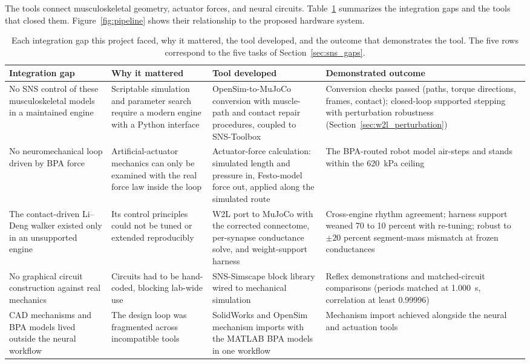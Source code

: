 The tools connect musculoskeletal geometry, actuator forces, and neural circuits. Table~\ref{tab:sns_capability} summarizes the integration gaps and the tools that closed them. Figure~\ref{fig:pipeline} shows their relationship to the proposed hardware system.

\begin{table}[htbp]
\caption[Integration gaps and the tools that closed them]{Each integration gap this project faced, why it mattered, the tool developed, and the outcome that demonstrates the tool. The five rows correspond to the five tasks of Section~\ref{sec:sns_gaps}.}
\label{tab:sns_capability}
\small
\begin{tabularx}{\textwidth}{@{}>{\raggedright\arraybackslash}p{}>{\raggedright\arraybackslash}p{}>{\raggedright\arraybackslash}p{}>{\raggedright\arraybackslash}X@{}}
\toprule
\textbf{Integration gap} & \textbf{Why it mattered} & \textbf{Tool developed} & \textbf{Demonstrated outcome} \\
\midrule
No SNS control of these musculoskeletal models in a maintained engine & Scriptable simulation and parameter search require a modern engine with a Python interface & OpenSim-to-MuJoCo conversion with muscle-path and contact repair procedures, coupled to SNS-Toolbox & Conversion checks passed (paths, torque directions, frames, contact); closed-loop supported stepping with perturbation robustness (Section~\ref{sec:w2l_perturbation}) \\
No neuromechanical loop driven by BPA force & Artificial-actuator mechanics can only be examined with the real force law inside the loop & Actuator-force calculation: simulated length and pressure in, Festo-model force out, applied along the simulated route & The BPA-routed robot model air-steps and stands within the \qty{620}{\kPa} ceiling \\
The contact-driven Li--Deng walker existed only in an unsupported engine & Its control principles could not be tuned or extended reproducibly & W2L port to MuJoCo with the corrected connectome, per-synapse conductance solve, and weight-support harness & Cross-engine rhythm agreement; harness support weaned 70 to 10 percent with re-tuning; robust to $\pm 20$ percent segment-mass mismatch at frozen conductances \\
No graphical circuit construction against real mechanics & Circuits had to be hand-coded, blocking lab-wide use & SNS-Simscape block library wired to mechanical simulation & Reflex demonstrations and matched-circuit comparisons (periods matched at \qty{1.000}{\second}, correlation at least 0.99996) \\
CAD mechanisms and BPA models lived outside the neural workflow & The design loop was fragmented across incompatible tools & SolidWorks and OpenSim mechanism imports with the MATLAB BPA models in one workflow & Mechanism import achieved alongside the neural and actuation tools \\
\bottomrule
\end{tabularx}
\end{table}

